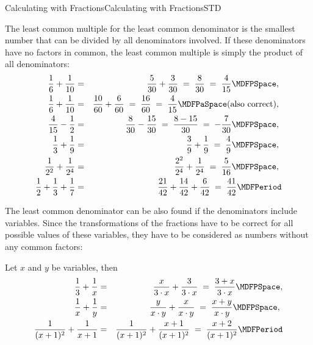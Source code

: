 \begin{MXContent}{Calculating with Fractions}{Calculating with Fractions}{STD}
\begin{MExample}
The least common multiple for the least common denominator is the smallest number that can
be divided by all denominators involved. If these denominators have no factors in common, the 
least common multiple is simply the product of all denominators:
\begin{eqnarray*}
\Mdfrac{1}{6}+\Mdfrac{1}{10} &=& \Mdfrac{5}{30}+\Mdfrac{3}{30} \;=\; \Mdfrac{8}{30} \;=\; \Mdfrac{4}{15}\MDFPSpace , \ \\
\Mdfrac{1}{6}+\Mdfrac{1}{10} &=& \Mdfrac{10}{60}+\Mdfrac{6}{60} \;=\; \Mdfrac{16}{60} \;=\; 
\Mdfrac{4}{15}\MDFPaSpace  \text{(also correct)}, \ \\
\Mdfrac{4}{15}-\Mdfrac1{2} &=& \Mdfrac{8}{30}-\Mdfrac{15}{30} \;=\; \Mdfrac{8-15}{30} \;=\; -\Mdfrac{7}{30}\MDFPSpace , \ \\
\Mdfrac{1}{3}+\Mdfrac{1}{9} &=& \Mdfrac{3}{9}+\Mdfrac19 \;=\; \Mdfrac49\MDFPSpace ,\ \\
\Mdfrac1{2^2}+\Mdfrac1{2^4} & = & \Mdfrac{2^2}{2^4}+\Mdfrac{1}{2^4} \;=\; \Mdfrac{5}{16}\MDFPSpace ,\ \\
\Mdfrac12+\Mdfrac13+\Mdfrac17 & = & \Mdfrac{21}{42}+\Mdfrac{14}{42}+\Mdfrac{6}{42} \;=\; \Mdfrac{41}{42}\MDFPeriod
\end{eqnarray*}
\end{MExample}

The least common denominator can be also found if the denominators include variables. Since
the transformations of the fractions have to be correct for all possible values of these variables, 
they have to be considered as numbers without any common factors:

\begin{MExample}
Let $x$ and $y$ be variables, then
\begin{eqnarray*}
\Mdfrac13+\Mdfrac1x & = & \Mdfrac{x}{3\cdot x}+\Mdfrac{3}{3\cdot x} \; =\; \Mdfrac{3+x}{3\cdot x}\MDFPSpace ,\\
\Mdfrac{1}{x}+\Mdfrac1{y} & = & \Mdfrac{y}{x\cdot y}+\Mdfrac{x}{x\cdot y} \;=\; \Mdfrac{x+y}{x\cdot y}\MDFPSpace ,\ \\
\Mdfrac{1}{(x+1)^2}+\Mdfrac1{x+1} & = & \Mdfrac{1}{(x+1)^2}+\Mdfrac{x+1}{(x+1)^2}\;=\;\Mdfrac{x+2}{(x+1)^2}\MDFPeriod
\end{eqnarray*}
\end{MExample}


\end{MXContent}
